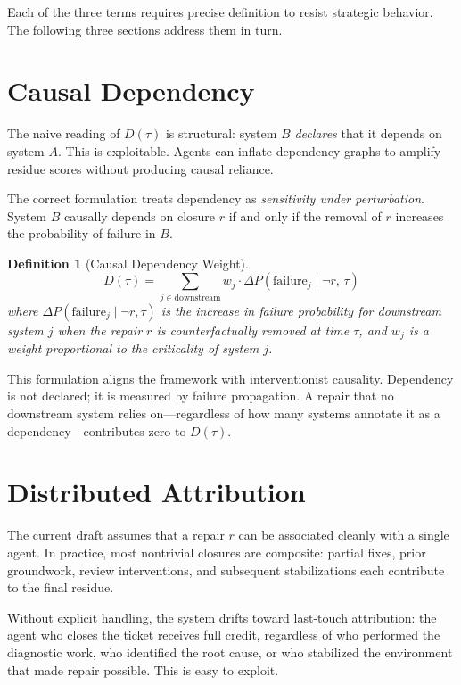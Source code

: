 \documentclass[12pt]{article}
\newtheorem{definition}{Definition}
\begin{document}
Each of the three terms requires precise definition to resist strategic
behavior. The following three sections address them in turn.

\section{Causal Dependency}

The naive reading of $D(\tau)$ is structural: system $B$ \emph{declares}
that it depends on system $A$. This is exploitable. Agents can inflate
dependency graphs to amplify residue scores without producing causal
reliance.

The correct formulation treats dependency as \emph{sensitivity under
perturbation}. System $B$ causally depends on closure $r$ if and only
if the removal of $r$ increases the probability of failure in $B$.

\begin{definition}[Causal Dependency Weight]
\[
  D(\tau) = \sum_{j \in \mathrm{downstream}}
    w_j \cdot \Delta P\!\left(\mathrm{failure}_j \mid \neg r,\, \tau\right)
\]
where $\Delta P(\mathrm{failure}_j \mid \neg r, \tau)$ is the increase
in failure probability for downstream system $j$ when the repair $r$ is
counterfactually removed at time $\tau$, and $w_j$ is a weight
proportional to the criticality of system $j$.
\end{definition}

This formulation aligns the framework with interventionist causality.
Dependency is not declared; it is measured by failure propagation. A
repair that no downstream system relies on---regardless of how many
systems annotate it as a dependency---contributes zero to $D(\tau)$.

\section{Distributed Attribution}

The current draft assumes that a repair $r$ can be associated cleanly
with a single agent. In practice, most nontrivial closures are
composite: partial fixes, prior groundwork, review interventions, and
subsequent stabilizations each contribute to the final residue.

Without explicit handling, the system drifts toward last-touch
attribution: the agent who closes the ticket receives full credit,
regardless of who performed the diagnostic work, who identified the root
cause, or who stabilized the environment that made repair possible. This
is easy to exploit.
\end{document}
